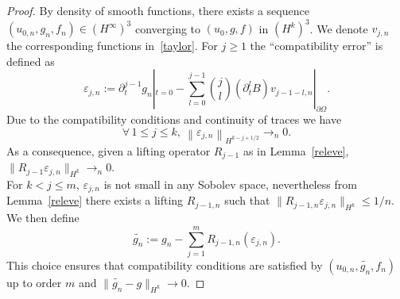 \documentclass[10pt]{amsart}
\theoremstyle{definition}\newtheorem{defi}[theo]{Definition}\newtheorem{rema}[theo]{Remark}\newtheorem{exam}[theo]{Example}\newtheorem{exem}[theo]{Example}\newtheorem{nota}[theo]{Notation}
\let\oldforall\forall
\renewcommand*{\forall}{\mathrel{\oldforall}}
\begin{document}
\begin{proof}
By density of smooth functions, there exists a sequence $(u_{0,n},g_n,f_n)\in (H^\infty)^3$ converging to $(u_0,g,f)$ in $(H^k)^3$. We denote $v_{j,n}$ the corresponding functions in~\eqref{taylor}. For $j\geq 1$ the ``compatibility error'' is defined as
\[
\varepsilon_{j,n}:=
\partial_t^{j-1}g_n|_{t=0}
-\sum_{l=0}^{j-1}\binom{j}{l} \left(\partial_t^lB\right)v_{j-1-l,n}|_{\partial\Omega}.
\]
Due to the compatibility conditions and continuity of traces we have
\[
\forall\,1\leq j\leq k,\
\left\|\varepsilon_{j,n}\right\|_{H^{k-j+1/2}}\longrightarrow_{n} 0.
\]
As a consequence, given a lifting operator $R_{j-1}$ as in Lemma~\ref{releve}, $\|R_{j-1}\varepsilon_{j,n}\|_{H^k}\to_n 0$.\\
For $k<j\leq m$, $\varepsilon_{j,n}$ is not small in any Sobolev space, nevertheless from Lemma~\ref{releve} there exists a lifting $R_{j-1,n}$ such that $\|R_{j-1,n}\varepsilon_{j,n}\|_{H^k}
\leq 1/n$. We then define
\[
\widetilde{g_n}:=g_n-\sum_{j=1}^m
R_{j-1,n}(\varepsilon_{j,n}).
\]
This choice ensures that compatibility conditions are satisfied by $(u_{0,n},\widetilde{g_n},f_n)$ up to order $m$ and $\|\widetilde{g_n}-g\|_{H^k}
\to 0$.
\end{proof}
\end{document}
